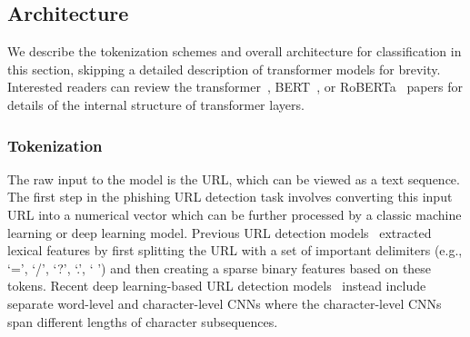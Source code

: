 \subsection{Architecture}
We describe the tokenization schemes and overall architecture for classification in this section, skipping a detailed description of transformer models for brevity.
Interested readers can review the transformer~\citep{vaswani2017attention}, BERT~\cite{devlin2019bert}, or RoBERTa~\citep{liu2019roberta} papers for details of the internal structure of transformer layers.

\subsubsection{Tokenization}
%
The raw input to the \URLTranSys model is the URL, which can be viewed as a text sequence.
The first step in the phishing URL detection task involves converting this input URL into a numerical vector which can be further processed by a classic machine learning or deep learning model.
Previous URL detection models~\citep{blum2020lexical} extracted lexical features by first splitting the URL with a set of important delimiters (e.g., `=', `/', `?', `.', ` ') and then creating a sparse binary features based on these tokens.
Recent deep learning-based URL detection models~\citep{le2018malicious,tajaddodianfar2020texception} instead include separate word-level and character-level CNNs where the character-level CNNs span different lengths of character subsequences.

